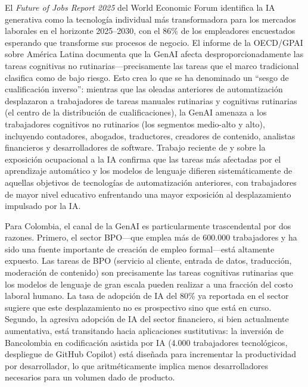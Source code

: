 \documentclass{article}
\begin{document}
El \textit{Future of Jobs Report 2025} del World Economic Forum \cite{wef2025} identifica la IA generativa como la tecnolog\'ia individual m\'as transformadora para los mercados laborales en el horizonte 2025--2030, con el 86\% de los empleadores encuestados esperando que transforme sus procesos de negocio. El informe de la OECD/GPAI sobre Am\'erica Latina \cite{oecd2025voces} documenta que la GenAI afecta desproporcionadamente las tareas cognitivas no rutinarias---precisamente las tareas que el marco tradicional clasifica como de bajo riesgo. Esto crea lo que se ha denominado un ``sesgo de cualificaci\'on inverso'': mientras que las oleadas anteriores de automatizaci\'on desplazaron a trabajadores de tareas manuales rutinarias y cognitivas rutinarias (el centro de la distribuci\'on de cualificaciones), la GenAI amenaza a los trabajadores cognitivos no rutinarios (los segmentos medio-alto y alto), incluyendo contadores, abogados, traductores, creadores de contenido, analistas financieros y desarrolladores de software. Trabajo reciente de \cite{webb2020} y \cite{felten2021} sobre la exposici\'on ocupacional a la IA confirma que las tareas m\'as afectadas por el aprendizaje autom\'atico y los modelos de lenguaje difieren sistem\'aticamente de aquellas objetivos de tecnolog\'ias de automatizaci\'on anteriores, con trabajadores de mayor nivel educativo enfrentando una mayor exposici\'on al desplazamiento impulsado por la IA.

Para Colombia, el canal de la GenAI es particularmente trascendental por dos razones. Primero, el sector BPO---que emplea m\'as de 600.000 trabajadores y ha sido una fuente importante de creaci\'on de empleo formal---est\'a altamente expuesto. Las tareas de BPO (servicio al cliente, entrada de datos, traducci\'on, moderaci\'on de contenido) son precisamente las tareas cognitivas rutinarias que los modelos de lenguaje de gran escala pueden realizar a una fracci\'on del costo laboral humano. La tasa de adopci\'on de IA del 80\% ya reportada en el sector sugiere que este desplazamiento no es prospectivo sino que est\'a en curso. Segundo, la agresiva adopci\'on de IA del sector financiero, si bien actualmente aumentativa, est\'a transitando hacia aplicaciones sustitutivas: la inversi\'on de Bancolombia en codificaci\'on asistida por IA (4.000 trabajadores tecnol\'ogicos, despliegue de GitHub Copilot) est\'a dise\~nada para incrementar la productividad por desarrollador, lo que aritm\'eticamente implica menos desarrolladores necesarios para un volumen dado de producto.
\end{document}
